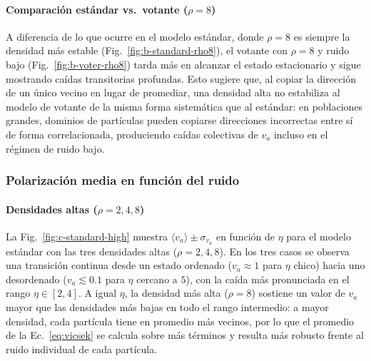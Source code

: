 \documentclass[11pt,a4paper]{article}
\begin{document}
\paragraph{Comparación estándar vs.\ votante ($\rho = 8$)}

A diferencia de lo
que ocurre en el modelo estándar, donde $\rho = 8$ es siempre la densidad
más estable (Fig.~\ref{fig:b-standard-rho8}), el votante con $\rho = 8$ y
ruido bajo (Fig.~\ref{fig:b-voter-rho8}) tarda más en alcanzar el estado
estacionario y sigue mostrando caídas transitorias profundas. Esto sugiere
que, al copiar la dirección de un único vecino en lugar de promediar, una
densidad alta no estabiliza al modelo de votante de la misma forma
sistemática que al estándar: en poblaciones grandes, dominios de
partículas pueden copiarse direcciones incorrectas entre sí de forma
correlacionada, produciendo caídas colectivas de $v_a$ incluso en el
régimen de ruido bajo.

\subsubsection{Polarización media en función del ruido}

\paragraph{Densidades altas ($\rho = 2, 4, 8$)}

\begin{center}
\end{center}

La Fig.~\ref{fig:c-standard-high} muestra $\langle v_a \rangle \pm
\sigma_{v_a}$ en función de $\eta$ para el modelo estándar con las tres
densidades altas ($\rho = 2, 4, 8$). En los tres casos
se observa una transición continua desde un estado ordenado
($v_a \approx 1$ para $\eta$ chico) hacia uno desordenado
($v_a \lesssim 0.1$ para $\eta$ cercano a $5$), con la caída más pronunciada
en el rango $\eta \in [2, 4]$. A igual $\eta$, la densidad más alta
($\rho = 8$) sostiene un valor de $v_a$ mayor que las densidades más bajas
en todo el rango intermedio: a mayor densidad, cada partícula tiene en
promedio más vecinos, por lo que el promedio de la Ec.~\eqref{eq:vicsek} se
calcula sobre más términos y resulta más robusto frente al ruido individual
de cada partícula.
\end{document}
